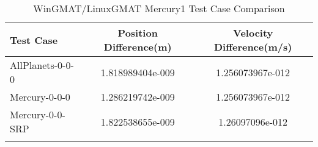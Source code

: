 \begin{table}[htbp!]
\centering
\caption{ WinGMAT/LinuxGMAT Mercury1 Test Case Comparison}
      \begin{tabular}{lcc}
      \hline\hline
          Test Case & Position Difference(m) & Velocity Difference(m/s) \\
         \hline
         AllPlanets-0-0-0 & 1.818989404e-009 & 1.256073967e-012 \\
         Mercury-0-0-0 & 1.286219742e-009 & 1.256073967e-012 \\
         Mercury-0-0-SRP & 1.822538655e-009 & 1.26097096e-012 \\
      \hline\hline
      \label{Table: Mercury1 WinGMAT-LinuxGMAT Table} 
\end{tabular}
\end{table}
